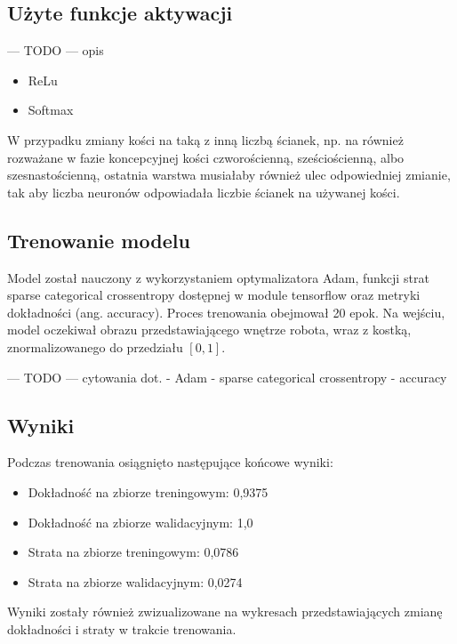 \subsection{Użyte funkcje aktywacji}
--- TODO --- opis
\begin{itemize}
    \item ReLu
    \item Softmax
\end{itemize}

W przypadku zmiany kości na taką z inną liczbą ścianek, np.
na również rozważane w fazie koncepcyjnej kości czworościenną, sześciościenną, albo szesnastościenną,
ostatnia warstwa musiałaby również ulec odpowiedniej zmianie,
tak aby liczba neuronów odpowiadała liczbie ścianek na używanej kości.

\subsection{Trenowanie modelu}\label{subsec:trenowanie-modelu}

Model został nauczony z wykorzystaniem optymalizatora Adam,
funkcji strat sparse categorical crossentropy dostępnej w module tensorflow oraz metryki dokładności (ang. accuracy).
Proces trenowania obejmował 20 epok.
Na wejściu, model oczekiwał obrazu przedstawiającego wnętrze robota, wraz z kostką, znormalizowanego do przedziału $[0, 1]$.

--- TODO ---
cytowania dot.
- Adam
- sparse categorical crossentropy
- accuracy

\subsection{Wyniki}\label{subsec:wyniki}

Podczas trenowania osiągnięto następujące końcowe wyniki:

\begin{itemize}
    \item Dokładność na zbiorze treningowym: 0,9375
    \item Dokładność na zbiorze walidacyjnym: 1,0
    \item Strata na zbiorze treningowym: 0,0786
    \item Strata na zbiorze walidacyjnym: 0,0274
\end{itemize}

Wyniki zostały również zwizualizowane na wykresach przedstawiających zmianę dokładności i straty w trakcie trenowania.

